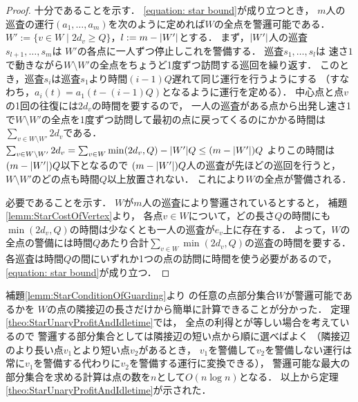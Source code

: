 \begin{proof}
  十分であることを示す．
  \eqref{equation: star bound}が成り立つとき，
  $m$人の巡査の運行$(a_1, \ldots, a_m)$を次のように定めれば$W$の全点を警邏可能である．
  $W' := \{ v \in W \mid 2d_v \geq Q \}$，$l := m - \lvert{W'}\rvert$とする．
  まず，$\lvert{W'}\rvert$人の巡査$s_{l + 1}, \ldots, s_m$は
  $W'$の各点に一人ずつ停止しこれを警備する．
  巡査$s_1, \ldots, s_l$は
  速さ$1$で動きながら$W \setminus W'$の全点をちょうど1度ずつ訪問する巡回を繰り返す．
  このとき，巡査$s_i$は巡査$s_1$より時間$(i - 1)Q$遅れて同じ運行を行うようにする
  （すなわち，$a_i(t) = a_1(t - (i - 1)Q)$となるように運行を定める）．
  中心点と点$v$の1回の往復には$2d_v$の時間を要するので，
  一人の巡査がある点から出発し速さ1で$W \setminus W'$の全点を1度ずつ訪問して最初の点に戻ってくるのにかかる時間は$\sum_{v \in W \setminus W'} 2d_v$である．
  $\sum_{v \in W \setminus W'} 2d_v
  = \sum_{v \in W} \min(2d_v, Q) - \lvert{W'}\rvert Q
  \leq (m - \lvert{W'}\rvert)Q$
  よりこの時間は$(m - \lvert{W'}\rvert)Q$以下となるので
  $(m - \lvert{W'}\rvert)Q$人の巡査が先ほどの巡回を行うと，
  $W \setminus W'$のどの点も時間$Q$以上放置されない．
  これにより$W$の全点が警備される．

  必要であることを示す．
  $W$が$m$人の巡査により警邏されているとすると，
  補題\ref{lemm:StarCostOfVertex}より，
  各点$v \in W$について，どの長さ$Q$の時間にも
  $\min(2d_v, Q)$の時間は少なくとも一人の巡査が$e_v$上に存在する．
  よって，$W$の全点の警備には時間$Q$あたり合計$\sum_{v \in W} \min(2d_v, Q)$の巡査の時間を要する．
  各巡査は時間$Q$の間にいずれか1つの点の訪問に時間を使う必要があるので，
  \eqref{equation: star bound}が成り立つ．
\end{proof}


補題\ref{lemm:StarConditionOfGuarding}より
{\graphStar}の任意の点部分集合$W$が警邏可能であるかを
$W$の点の隣接辺の長さだけから簡単に計算できることが分かった．
定理\ref{theo:StarUnaryProfitAndIdletime}では，
全点の利得と{\maxIdletime}が等しい場合を考えているので
警邏する部分集合としては隣接辺の短い点から順に選べばよく
（隣接辺のより長い点$v_1$とより短い点$v_2$があるとき，
$v_1$を警備して$v_2$を警備しない運行は常に$v_1$を警備する代わりに$v_2$を警備する運行に変換できる），
警邏可能な最大の部分集合を求める計算は点の数を$n$として$O(n \log n)$となる．
以上から定理\ref{theo:StarUnaryProfitAndIdletime}が示された．
